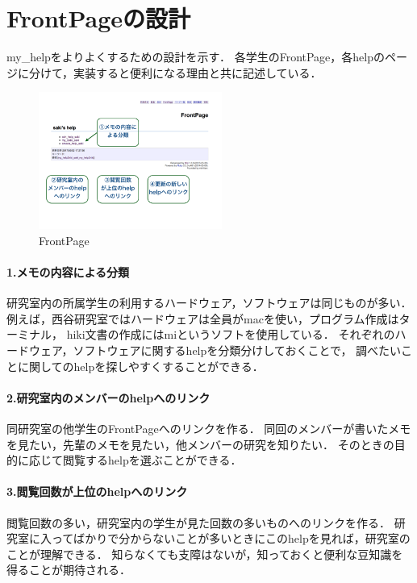 \section{FrontPageの設計}
my\_helpをよりよくするための設計を示す．
各学生のFrontPage，各helpのページに分けて，実装すると便利になる理由と共に記述している．

\begin{figure}[htbp]\begin{center}
\includegraphics[width=6cm,bb=100 100 600 700]{my_help2hiki_saki.008.png}
\caption{FrontPage}
\label{default}\end{center}\end{figure}

\paragraph{1.メモの内容による分類}
\begin{description}
\item 研究室内の所属学生の利用するハードウェア，ソフトウェアは同じものが多い．
例えば，西谷研究室ではハードウェアは全員がmacを使い，プログラム作成はターミナル，
hiki文書の作成にはmiというソフトを使用している．
それぞれのハードウェア，ソフトウェアに関するhelpを分類分けしておくことで，
調べたいことに関してのhelpを探しやすくすることができる．
\end{description}

\paragraph{2.研究室内のメンバーのhelpへのリンク}
\begin{description}
\item 同研究室の他学生のFrontPageへのリンクを作る．
同回のメンバーが書いたメモを見たい，先輩のメモを見たい，他メンバーの研究を知りたい．
そのときの目的に応じて閲覧するhelpを選ぶことができる．
\end{description}

\paragraph{3.閲覧回数が上位のhelpへのリンク}
\begin{description}
\item 閲覧回数の多い，研究室内の学生が見た回数の多いものへのリンクを作る．
研究室に入ってばかりで分からないことが多いときにこのhelpを見れば，研究室のことが理解できる．
知らなくても支障はないが，知っておくと便利な豆知識を得ることが期待される．
\end{description}

